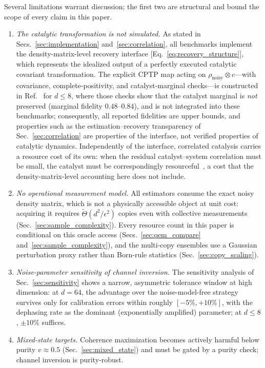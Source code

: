 \documentclass[12pt,a4paper]{article}
\newcommand{\rhon}{\rho_\mathrm{noisy}}
\begin{document}
Several limitations warrant discussion; the first two are structural and bound the scope of every claim in this paper.
\begin{enumerate}
\item \emph{The catalytic transformation is not simulated.}
As stated in Secs.~\ref{sec:implementation} and~\ref{sec:correlation}, all benchmarks implement the density-matrix-level recovery interface [Eq.~\eqref{eq:recovery_structure}], which represents the idealized output of a perfectly executed catalytic covariant transformation.
The explicit CPTP map acting on $\rhon \otimes c$---with covariance, complete-positivity, and catalyst-marginal checks---is constructed in Ref.~\cite{Wakaura2026unified} for $d \leq 8$, where those checks show that the catalyst marginal is \emph{not} preserved (marginal fidelity $0.48$--$0.84$), and is not integrated into these benchmarks; consequently, all reported fidelities are upper bounds, and properties such as the estimation--recovery transparency of Sec.~\ref{sec:correlation} are properties of the interface, not verified properties of catalytic dynamics.
Independently of the interface, correlated catalysis carries a resource cost of its own: when the residual catalyst--system correlation must be small, the catalyst must be correspondingly resourceful~\cite{Rubboli2022limits}, a cost that the density-matrix-level accounting here does not include.
\item \emph{No operational measurement model.}
All estimators consume the exact noisy density matrix, which is not a physically accessible object at unit cost: acquiring it requires $\tilde\Theta(d^2/\epsilon^2)$ copies even with collective measurements (Sec.~\ref{sec:sample_complexity}).
Every resource count in this paper is conditional on this oracle access (Secs.~\ref{sec:qem_compare} and~\ref{sec:sample_complexity}), and the multi-copy ensembles use a Gaussian perturbation proxy rather than Born-rule statistics (Sec.~\ref{sec:copy_scaling}).
\item \emph{Noise-parameter sensitivity of channel inversion.}
The sensitivity analysis of Sec.~\ref{sec:sensitivity} shows a narrow, asymmetric tolerance window at high dimension: at $d = 64$, the advantage over the noise-model-free strategy survives only for calibration errors within roughly $[-5\%, +10\%]$, with the dephasing rate as the dominant (exponentially amplified) parameter; at $d \leq 8$, $\pm 10\%$ suffices.
\item \emph{Mixed-state targets.}
Coherence maximization becomes actively harmful below purity $v \approx 0.5$ (Sec.~\ref{sec:mixed_state}) and must be gated by a purity check; channel inversion is purity-robust.

\end{enumerate}
\end{document}

